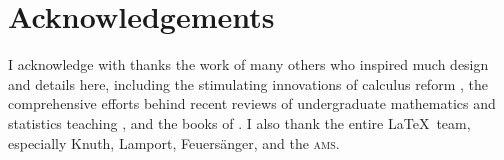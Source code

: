 \section*{Acknowledgements}

I acknowledge with thanks the work of many others who inspired much design and details here, including 
the stimulating innovations of calculus reform \cite[e.g.]{HughesHallett2013},  
the comprehensive efforts behind recent reviews of  undergraduate mathematics and statistics teaching \cite[e.g.]{Alpers2013, Bressoud2014, Turner2014, StatsEduGuidelines2014, CUPMguide2015, gaimme2016}, 
and the books of \cite{Anton6, Davis99a, Holt2013, Larson2013, Lay2012, Nakos1998, Poole2015, Will04}.
I also thank the entire \LaTeX\ team, especially Knuth, Lamport, Feuers\"anger, and the \textsc{ams}.








